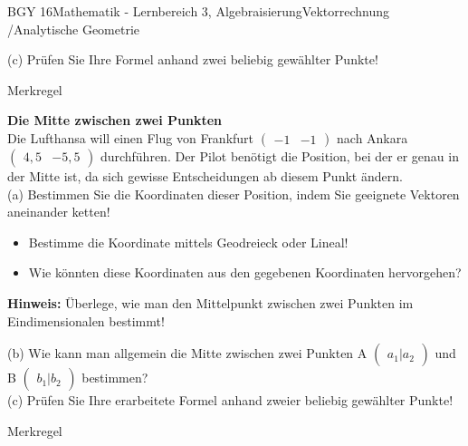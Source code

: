 \documentclass[oneside,openany,headings=optiontotoc,11pt,numbers=noenddot]{scrreprt}
\begin{document}
\begin{worksheet}{BGY 16}{Mathematik - Lernbereich 3, Algebraisierung}{Vektorrechnung /Analytische Geometrie}
\begin{framed}
			(c) Prüfen Sie Ihre Formel anhand zwei beliebig gewählter Punkte!\\
		\end{framed}
		\begin{framed}
			\color{codegray}\tiny Merkregel\\
			\par
			\bigskip
			\color{black}
		\end{framed}
		\newpage
		\begin{framed}
			\noindent
			\textbf{Die Mitte zwischen zwei Punkten}\\
			Die Lufthansa will einen Flug von Frankfurt \(\begin{pmatrix}-1 & -1\end{pmatrix}\) nach Ankara \(\begin{pmatrix}4,5 & -5,5\end{pmatrix}\) durchführen. Der Pilot benötigt die Position, bei der er genau in der Mitte ist, da sich gewisse Entscheidungen ab diesem Punkt ändern.\\
			(a) Bestimmen Sie die Koordinaten dieser Position, indem Sie geeignete Vektoren aneinander ketten!
			\begin{framed}
					\begin{itemize}
						\item Bestimme die Koordinate mittels Geodreieck oder Lineal!
						\item Wie könnten diese Koordinaten aus den gegebenen Koordinaten hervorgehen?
					\end{itemize}
					\color{codegray}\tiny{\textbf{Hinweis:} Überlege, wie man den Mittelpunkt zwischen zwei Punkten im Eindimensionalen bestimmt!}
					\color{black}
			\end{framed}
			\noindent
			(b) Wie kann man allgemein die Mitte zwischen zwei Punkten A \(\begin{pmatrix}a_{1}|a_{2}\end{pmatrix}\) und B \(\begin{pmatrix}b_{1}|b_{2}\end{pmatrix}\) bestimmen?\\
			(c) Prüfen Sie Ihre erarbeitete Formel anhand zweier beliebig gewählter Punkte!\\
		\end{framed}
		\begin{framed}
			\color{codegray}\tiny Merkregel
			\par

\end{framed}
\end{worksheet}
\end{document}
